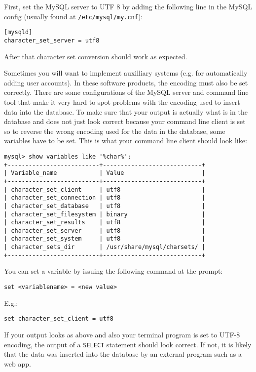 \documentclass[12pt]{book}
\begin{document}
First, set the MySQL server to UTF 8 by adding the following line in the MySQL config (usually found at {\tt /etc/mysql/my.cnf}):

\begin{verbatim}
[mysqld]
character_set_server = utf8
\end{verbatim}

After that character set conversion should work as expected. 

Sometimes you will want to implement auxilliary systems (e.g. for automatically adding user accounts). In these software products, the encoding must also be set correctly. There are some configurations of the MySQL server and command line tool that make it very hard to spot problems with the encoding used to insert data into the database. To make sure that your output is actually what is in the database and does not just look correct because your command line client is set so to reverse the wrong encoding used for the data in the database, some variables have to be set. This is what your command line client should look like:

\begin{verbatim}
mysql> show variables like '%char%';
+--------------------------+----------------------------+
| Variable_name            | Value                      |
+--------------------------+----------------------------+
| character_set_client     | utf8                       | 
| character_set_connection | utf8                       | 
| character_set_database   | utf8                       | 
| character_set_filesystem | binary                     | 
| character_set_results    | utf8                       | 
| character_set_server     | utf8                       | 
| character_set_system     | utf8                       | 
| character_sets_dir       | /usr/share/mysql/charsets/ | 
+--------------------------+----------------------------+
\end{verbatim}

You can set a variable by issuing the following command at the prompt:

\begin{verbatim}
set <variablename> = <new value>
\end{verbatim}

E.g.:

\begin{verbatim}
set character_set_client = utf8
\end{verbatim}

If your output looks as above and also your terminal program is set to UTF-8 encoding, the output of a {\tt SELECT} statement should look correct. If not, it is likely that the data was inserted into the database by an external program such as a web app.
\end{document}
